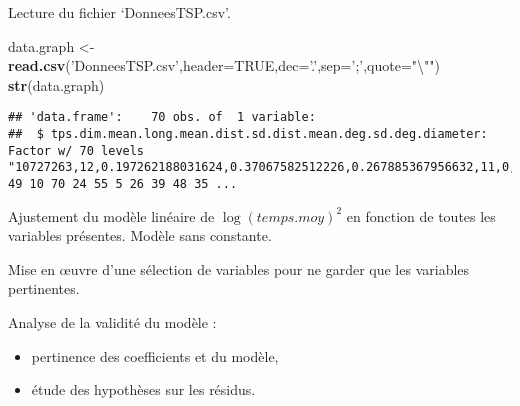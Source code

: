 \documentclass[]{article}
\newenvironment{Shaded}{\begin{snugshade}}{\end{snugshade}}
\newcommand{\CharTok}[1]{\textcolor[rgb]{0.31,0.60,0.02}{#1}}
\newcommand{\CommentTok}[1]{\textcolor[rgb]{0.56,0.35,0.01}{\textit{#1}}}
\newcommand{\DataTypeTok}[1]{\textcolor[rgb]{0.13,0.29,0.53}{#1}}
\newcommand{\KeywordTok}[1]{\textcolor[rgb]{0.13,0.29,0.53}{\textbf{#1}}}
\newcommand{\NormalTok}[1]{#1}
\newcommand{\OtherTok}[1]{\textcolor[rgb]{0.56,0.35,0.01}{#1}}
\newcommand{\StringTok}[1]{\textcolor[rgb]{0.31,0.60,0.02}{#1}}
\begin{document}
Lecture du fichier `DonneesTSP.csv'.

\begin{Shaded}
\begin{Highlighting}[]
\NormalTok{data.graph <-}\StringTok{ }\KeywordTok{read.csv}\NormalTok{(}\StringTok{'DonneesTSP.csv'}\NormalTok{,}\DataTypeTok{header=}\OtherTok{TRUE}\NormalTok{,}\DataTypeTok{dec=}\StringTok{'.'}\NormalTok{,}\DataTypeTok{sep=}\StringTok{';'}\NormalTok{,}\DataTypeTok{quote=}\StringTok{"}\CharTok{\textbackslash{}"}\StringTok{"}\NormalTok{)}
\KeywordTok{str}\NormalTok{(data.graph)}
\end{Highlighting}
\end{Shaded}

\begin{verbatim}
## 'data.frame':    70 obs. of  1 variable:
##  $ tps.dim.mean.long.mean.dist.sd.dist.mean.deg.sd.deg.diameter: Factor w/ 70 levels "10727263,12,0.197262188031624,0.37067582512226,0.267885367956632,11,0,1",..: 49 10 70 24 55 5 26 39 48 35 ...
\end{verbatim}

Ajustement du modèle linéaire de \(\log(temps.moy)^2\) en fonction de
toutes les variables présentes. Modèle sans constante.

\begin{Shaded}
\end{Shaded}

Mise en \oe uvre d'une sélection de variables pour ne garder que les
variables pertinentes.

Analyse de la validité du modèle :

\begin{itemize}
\item
  pertinence des coefficients et du modèle,
\item
  étude des hypothèses sur les résidus.
\end{itemize}
\end{document}
